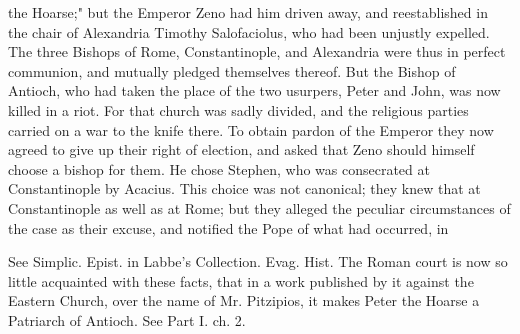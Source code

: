 the Hoarse;" but the Emperor Zeno had him driven away, and reestablished in the chair of Alexandria Timothy Salofaciolus, who had been unjustly expelled. The three Bishops of Rome, Constantinople, and Alexandria were thus in perfect communion, and mutually pledged themselves thereof. But the Bishop of Antioch, who had taken the place of the two usurpers, Peter and John, was now killed in a riot. For that church was sadly divided, and the religious parties carried on a war to the knife there. To obtain pardon of the Emperor they now agreed to give up their right of election, and asked that Zeno should himself choose a bishop for them. He chose Stephen, who was consecrated at Constantinople by Acacius. This choice was not canonical; they knew that at Constantinople as well as at Rome; but they alleged the peculiar circumstances of the case as their excuse, and notified the Pope of what had occurred, in

See Simplic. Epist. in Labbe’s Collection. Evag. Hist. The Roman court is now so little acquainted with these facts, that in a work published by it against the Eastern Church, over the name of Mr. Pitzipios, it makes Peter the Hoarse a Patriarch of Antioch. See Part I. ch. 2.

